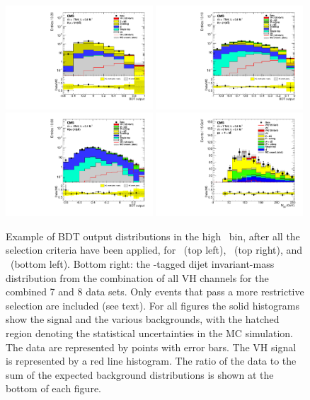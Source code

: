 \documentclass[11pt,twoside,a4paper,cmspaper,final,collab]{cms-tdr}
\begin{document}
\begin{figure}[tbp]
  \begin{center}
    \includegraphics[width=0.49\textwidth]{figures/hbb_Zmm_HighPt_PostFit_s_7TeV.pdf}
    \includegraphics[width=0.49\textwidth]{figures/hbb_Znn_HighPt_PostFit_s_7TeV.pdf}
    \includegraphics[width=0.49\textwidth]{figures/hbb_Wen_HighPt_PostFit_s_8TeV.pdf}
    \includegraphics[width=0.49\textwidth]{figures/hbb_Mbb.pdf}
    \caption{Example of BDT output distributions in the
    high \ptV\ bin, after all the selection criteria have been applied, for \ZmmH\ (top left),
       \ZnnH\ (top right), and \WenH\ (bottom left). Bottom right: the
       \cPqb-tagged dijet invariant-mass distribution from the combination of all
  VH channels for the combined  7 and 8\TeV
  data sets. Only events that pass
    a more restrictive selection are included (see text). For all figures the solid
    histograms show the signal and the various
      backgrounds, with the hatched region denoting the statistical
    uncertainties in the MC simulation. The data are represented by points
      with error bars. The VH signal is represented by a red line
      histogram. The ratio of the data to the sum of the
    expected background distributions is shown at the bottom of each
    figure.}
    \label{fig:Hbb_figs}
  \end{center}
\end{figure}
\end{document}
